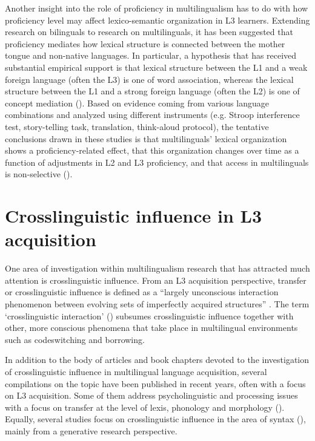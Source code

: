 \documentclass[output=paper,colorlinks,citecolor=brown,nonflat]{langsci/langscibook}
\begin{document}
Another insight into the role of proficiency in multilingualism has to do with how proficiency level may affect lexico-semantic organization in L3 learners. Extending research on bilinguals to research on multilinguals, it has been suggested that proficiency mediates how lexical structure is connected between the mother tongue and non-native languages. In particular, a hypothesis that has received substantial empirical support is that lexical structure between the L1 and a weak foreign language (often the L3) is one of word association, whereas the lexical structure between the L1 and a strong foreign language (often the L2) is one of concept mediation (\citealt{Abunuwara1992, Schönpflug2000, Herwig2001, CenozEtAl2003}). Based on evidence coming from various language combinations and analyzed using different instruments (e.g. Stroop interference test, story-telling task, translation, think-aloud protocol), the tentative conclusions drawn in these studies is that multilinguals’ lexical organization shows a proficiency-related effect, that this organization changes over time as a function of adjustments in L2 and L3 proficiency, and that access in multilinguals is non-selective (\citealt{DijkstraVanHell2003}).

\section{Crosslinguistic influence in L3 acquisition}\label{sec:sanchez1:4}

One area of investigation within multilingualism research that has attracted much attention is crosslinguistic influence. From an L3 acquisition perspective, transfer or crosslinguistic influence is defined as a “largely unconscious interaction phenomenon between evolving sets of imperfectly acquired structures” \citep[143]{Bouvy2000}. The term ‘crosslinguistic interaction’ (\citealt{HerdinaJessner2002, Jessner2003}) subsumes crosslinguistic influence together with other, more conscious phenomena that take place in multilingual environments such as codeswitching and borrowing.

  In addition to the body of articles and book chapters devoted to the investigation of crosslinguistic influence in multilingual language acquisition, several compilations on the topic have been published in recent years, often with a focus on L3 acquisition. Some of them address psycholinguistic and processing issues with a focus on transfer at the level of lexis, phonology and morphology (\citealt{DeAngelisEtAl2015, Peukert2015}). Equally, several studies focus on crosslinguistic influence in the area of syntax (\citealt{Leung2009, CabrelliEtAl2012, AngelovskaHahn2017}), mainly from a generative research perspective.
\end{document}
